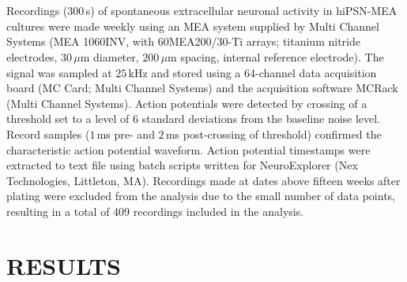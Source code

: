 \documentclass[12pt, titlepage]{article}
\begin{document}
\\ \\ Recordings ($300$\,s) of spontaneous extracellular neuronal activity in hiPSN-MEA cultures were made weekly using an MEA system supplied by Multi Channel Systems (MEA 1060INV, with 60MEA200/30-Ti arrays; titanium nitride electrodes, $30\,\mu$m diameter, $200\,\mu$m spacing, internal reference electrode). The signal was sampled at $25\,$kHz and stored using a 64-channel data acquisition board (MC Card; Multi Channel Systems) and the acquisition software MCRack (Multi Channel Systems). Action potentials were detected by crossing of a threshold set to a level of 6 standard deviations from the baseline noise level. Record samples ($1\,$ms pre- and $2\,$ms post-crossing of threshold) confirmed the characteristic action potential waveform. Action potential timestamps were extracted to text file using batch scripts written for NeuroExplorer (Nex Technologies, Littleton, MA). Recordings made at dates above fifteen weeks after plating were excluded from the analysis due to the small number of data points, resulting in a total of 409 recordings included in the analysis.
	\section*{RESULTS}
\end{document}
